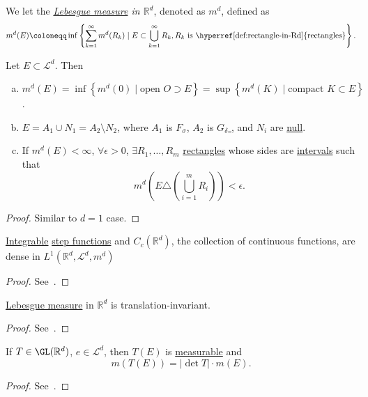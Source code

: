 \begin{definition}
	We let the \emph{\hyperref[def:Lebesgue-measure]{Lebesgue measure} in \(\mathbb{R} ^d\)}, denoted as \(m^d\), defined as
	\[
		m^d(E) \coloneqq \inf \left\{\sum_{k=1}^{\infty} m^d(R_{k} )\mid E\subset \bigcup_{k=1}^{\infty} R_{k} , R_{k} \text{ is \hyperref[def:rectangle-in-Rd]{rectangles}}\right\}.
	\]
\end{definition}
\begin{theorem}\label{thm:lec-20}
	Let \(E\subset \mathcal{L} ^d\). Then
	\begin{enumerate}[(a)]
		\item \(m^d(E) = \inf \left\{m^d (0) \mid \text{open } O\supset E \right\} = \sup \left\{m^d (K)\mid \text{compact }K\subset E \right\}\).
		\item \(E = A_1 \cup N_1 = A_2 \setminus N_2\), where \(A_1\) is \hyperref[def:F-sigma-set]{\(F_\sigma \)}, \(A_2\) is \hyperref[def:G-delta-set]{\(G_\delta \) }, and \(N_{i} \) are \hyperref[def:mu-null-set]{null}.
		\item If \(m^d(E)<\infty \), \(\forall \epsilon >0\), \(\exists R_1, \dots , R_m \) \hyperref[def:rectangle-in-Rd]{rectangles} whose sides are \underline{intervals} such that
		      \[
			      m^d \left(E\triangle \left(\bigcup_{i=1}^{m} R_{i} \right)\right)< \epsilon .
		      \]
	\end{enumerate}
\end{theorem}
\begin{proof}
	Similar to \(d = 1\) case.
\end{proof}

\begin{theorem}
	\hyperref[def:integrable]{Integrable} \hyperref[def:step-function]{step functions} and \(C_c(\mathbb{R} ^d)\), the collection
	of continuous functions, are dense in \(L^1(\mathbb{R} ^d, \mathcal{L} ^d, m^d)\)
\end{theorem}
\begin{proof}
	See~\cite{folland1999real}.
\end{proof}

\begin{theorem}
	\hyperref[def:Lebesgue-measure]{Lebesgue measure} in \(\mathbb{R} ^d\) is translation-invariant.
\end{theorem}
\begin{proof}
	See~\cite{folland1999real}.
\end{proof}

\begin{theorem}\label{thm:effect-of-linear-transformation-on-Lebesgue-measure}
	If \(T\in \GL (\mathbb{R} ^d)\), \(e\in \mathcal{L} ^d\), then \(T(E)\) is \hyperref[def:measurable-function]{measurable} and
	\[
		m(T(E)) = \left\vert \det T \right\vert \cdot m(E).
	\]
\end{theorem}
\begin{proof}
	See~\cite{folland1999real}.
\end{proof}


